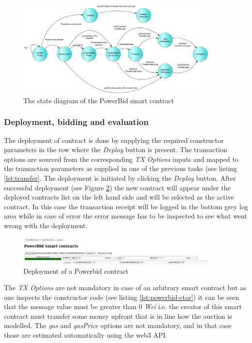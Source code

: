 \documentclass[a4paper]{article}
\begin{document}
\begin{figure}[H]
    \centering
    \includegraphics[width=0.9\textwidth]{figures/state_diagram.png}
    \caption{The state diagram of the PowerBid smart contract}
    \label{fig:State-diagram-powerbid}
\end{figure}

\subsubsection{Deployment, bidding and evaluation}

The deployment of contract is done by supplying the required constructor parameters in the row where the \emph{Deploy} button is present. The transaction options are sourced from the corresponding \emph{TX Options} inputs and mapped to the transaction parameters as supplied in one of the previous tasks (see listing \ref{lst:transfer}. The deployment is initiated by clicking the \emph{Deploy} button. After successful deployment (see Figure \ref{fig:deploy-powerbid}) the new contract will appear under the deployed contracts list on the left hand side and will be selected as the active contract. In this case the transaction receipt will be logged in the bottom grey log area while in case of error the error message has to be inspected to see what went wrong with the deployment.


\begin{figure}[H]
    \centering
    \includegraphics[width=0.9\textwidth]{figures/ui-deploy.png}
    \caption{Deployment of a Powerbid contract}
    \label{fig:deploy-powerbid}
\end{figure}

The \emph{TX Options} are not mandatory in case of an arbitrary smart contract but as one inspects the constructor code (see listing \ref{lst:powerbid-ctor}) it can be seen that  the message value must be greater than 0 \emph{Wei} i.e. the creator of this smart contract must transfer some money upfront that is in line how the auction is modelled. The \emph{gas} and \emph{gasPrice} options are not mandatory, and in that case those are estimated automatically using the web3 API. 
\end{document}
